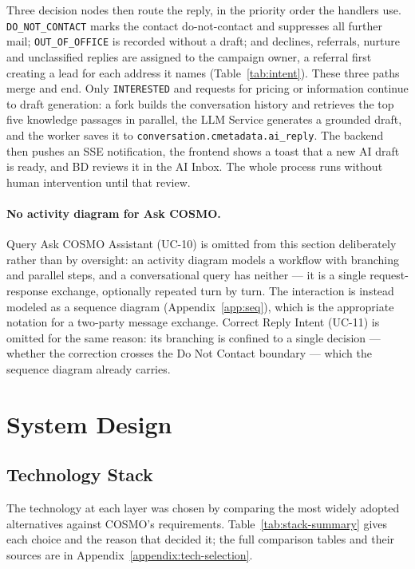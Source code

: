 \documentclass[a4paper]{article}
\begin{document}
Three decision nodes then route the reply, in the priority order the handlers
use. \texttt{DO\_NOT\_CONTACT} marks the contact do-not-contact and suppresses
all further mail; \texttt{OUT\_OF\_OFFICE} is recorded without a draft; and
declines, referrals, nurture and unclassified replies are assigned to the
campaign owner, a referral first creating a lead for each address it names
(Table~\ref{tab:intent}). These three paths merge and end. Only
\texttt{INTERESTED} and requests for pricing or information continue to draft
generation: a fork builds the conversation history and retrieves the top five
knowledge passages in parallel, the LLM Service generates a grounded draft, and
the worker saves it to \texttt{conversation.cmetadata.ai\_reply}. The backend
then pushes an SSE notification, the frontend shows a toast that a new AI draft
is ready, and BD reviews it in the AI Inbox. The whole process runs without
human intervention until that review.

\paragraph{No activity diagram for Ask COSMO.} Query Ask COSMO
Assistant (UC-10) is omitted from this section deliberately rather
than by oversight: an activity diagram models a workflow with
branching and parallel steps, and a conversational query has neither
--- it is a single request-response exchange, optionally repeated
turn by turn. The interaction is instead modeled as a sequence
diagram (Appendix~\ref{app:seq}), which is the appropriate notation
for a two-party message exchange. Correct Reply Intent (UC-11) is
omitted for the same reason: its branching is confined to a single
decision --- whether the correction crosses the Do Not Contact
boundary --- which the sequence diagram already carries.



\newpage
\section{System Design}
\label{ch:design}
\subsection{Technology Stack}

The technology at each layer was chosen by comparing the most widely adopted
alternatives against COSMO's requirements. Table~\ref{tab:stack-summary} gives
each choice and the reason that decided it; the full comparison tables and
their sources are in Appendix~\ref{appendix:tech-selection}.
\end{document}
